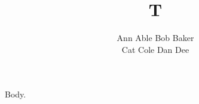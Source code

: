 \documentclass{article}
\begin{document}
\title{T}
\author{Ann Able \quad Bob Baker\\ Cat Cole \quad Dan Dee}
\maketitle
Body.
\end{document}
